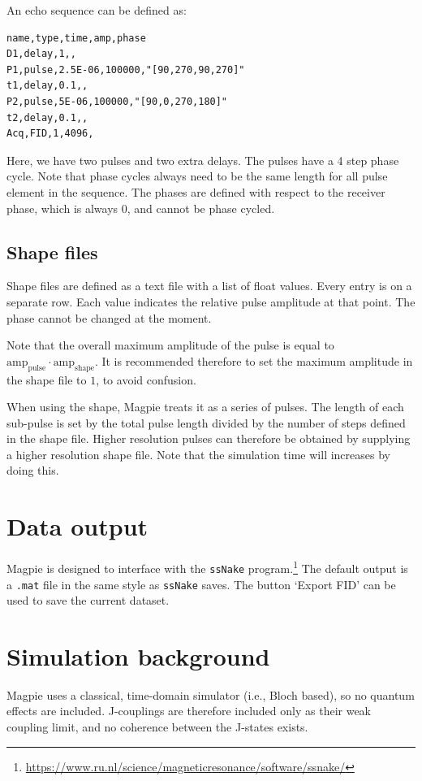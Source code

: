 \documentclass[11pt,a4paper]{article}
\begin{document}
An echo sequence can be defined as:

\begin{verbatim}
name,type,time,amp,phase
D1,delay,1,,
P1,pulse,2.5E-06,100000,"[90,270,90,270]"
t1,delay,0.1,,
P2,pulse,5E-06,100000,"[90,0,270,180]"
t2,delay,0.1,,
Acq,FID,1,4096,
\end{verbatim}
Here, we have two pulses and two extra delays. The pulses have a 4 step phase cycle. Note that phase cycles always need to be the same length for all pulse element in the sequence. The phases are defined with respect to the receiver phase, which is always 0, and cannot be phase cycled.


\subsection{Shape files}\label{sec:shape}
Shape files are defined as a text file with a list of float values. Every entry is on a separate row. Each value indicates the relative pulse amplitude at that point. The phase cannot be changed at the moment.

Note that the overall maximum amplitude of the pulse is equal to $\text{amp}_\text{pulse} \cdot \text{amp}_\text{shape}$. It is recommended therefore to set the maximum amplitude in the shape file to $1$, to avoid confusion.

When using the shape, Magpie treats it as a series of pulses. The length of each sub-pulse is set by the total pulse length divided by the number of steps defined in the shape file. Higher resolution pulses can therefore be obtained by supplying a higher resolution shape file. Note that the simulation time will increases by doing this.




\section{Data output}
Magpie is designed to interface with the \texttt{ssNake} program.\footnote{\url{https://www.ru.nl/science/magneticresonance/software/ssnake/}} The default output is a \texttt{.mat} file in the same style as \texttt{ssNake} saves. The button `Export FID' can be used to save the current dataset.



\section{Simulation background}
Magpie uses a classical, time-domain simulator (i.e., Bloch based), so no quantum effects are included. J-couplings are therefore included only as their weak coupling limit, and no coherence between the J-states exists.
\end{document}
